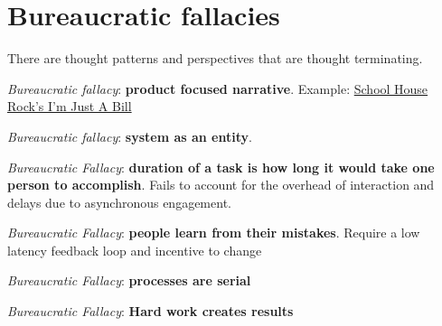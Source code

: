 \section{Bureaucratic fallacies}

There are thought patterns and perspectives that are \gls{thought terminating}. 

\textit{Bureaucratic fallacy}: \textbf{product focused narrative}. Example: \href{https://www.youtube.com/watch?v=OgVKvqTItto}{School House Rock's I'm Just A Bill}

\textit{Bureaucratic fallacy}: \textbf{system as an entity}. \cite{2002_Gall}

\textit{Bureaucratic Fallacy}: \textbf{duration of a task is how long it would take one person to accomplish}. Fails to account for the overhead of interaction and delays due to asynchronous engagement.

\textit{Bureaucratic Fallacy}: \textbf{people learn from their mistakes}. Require a low latency feedback loop and incentive to change

\textit{Bureaucratic Fallacy}: \textbf{processes are serial}


\textit{Bureaucratic Fallacy}: \textbf{Hard work creates results}